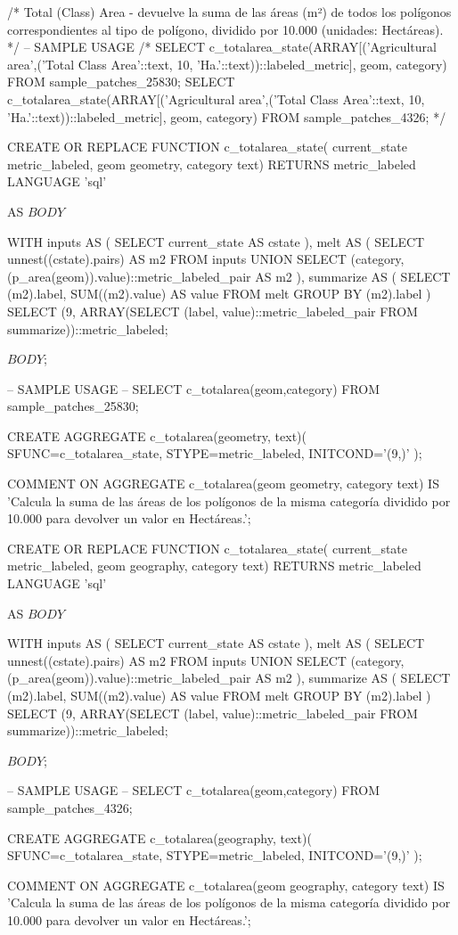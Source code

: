 \lstset{caption=Función para calcular CA por categorías.,label= c_area}
\begin{SQL}
/*
Total (Class) Area - devuelve la suma de las áreas (m²) de todos los polígonos correspondientes al tipo de polígono, dividido por 10.000 (unidades: Hectáreas).
*/
-- SAMPLE USAGE
/*
SELECT c_totalarea_state(ARRAY[('Agricultural area',('Total Class Area'::text, 10, 'Ha.'::text))::labeled_metric], geom, category) FROM sample_patches_25830;
SELECT c_totalarea_state(ARRAY[('Agricultural area',('Total Class Area'::text, 10, 'Ha.'::text))::labeled_metric], geom, category) FROM sample_patches_4326;
*/

CREATE OR REPLACE FUNCTION c_totalarea_state(
	current_state metric_labeled,
	geom geometry,
	category text)
    RETURNS metric_labeled
    LANGUAGE 'sql'

AS 
$BODY$

WITH inputs AS (
    	SELECT current_state AS cstate
), melt AS (
    	SELECT unnest((cstate).pairs) AS m2 FROM inputs
    	UNION 
	SELECT (category, (p_area(geom)).value)::metric_labeled_pair AS m2
), summarize AS (
	SELECT (m2).label, SUM((m2).value) AS value FROM melt GROUP BY (m2).label
)
SELECT (9, ARRAY(SELECT (label, value)::metric_labeled_pair FROM summarize))::metric_labeled;

$BODY$;


-- SAMPLE USAGE
-- SELECT c_totalarea(geom,category) FROM sample_patches_25830;

CREATE AGGREGATE c_totalarea(geometry, text)(
    SFUNC=c_totalarea_state,
    STYPE=metric_labeled,
    INITCOND='(9,{})'
);

COMMENT ON AGGREGATE c_totalarea(geom geometry, category text) IS 'Calcula la suma de las áreas de los polígonos de la misma categoría dividido por 10.000 para devolver un valor en Hectáreas.';



CREATE OR REPLACE FUNCTION c_totalarea_state(
	current_state metric_labeled,
	geom geography,
	category text)
    RETURNS metric_labeled
    LANGUAGE 'sql'

AS 
$BODY$

WITH inputs AS (
    	SELECT current_state AS cstate
), melt AS (
    	SELECT unnest((cstate).pairs) AS m2 FROM inputs
    	UNION 
	SELECT (category, (p_area(geom)).value)::metric_labeled_pair AS m2
), summarize AS (
	SELECT (m2).label, SUM((m2).value) AS value FROM melt GROUP BY (m2).label
)
SELECT (9, ARRAY(SELECT (label, value)::metric_labeled_pair FROM summarize))::metric_labeled;

$BODY$;


-- SAMPLE USAGE
-- SELECT c_totalarea(geom,category) FROM sample_patches_4326;

CREATE AGGREGATE c_totalarea(geography, text)(
    SFUNC=c_totalarea_state,
    STYPE=metric_labeled,
    INITCOND='(9,{})'
);

COMMENT ON AGGREGATE c_totalarea(geom geography, category text) IS 'Calcula la suma de las áreas de los polígonos de la misma categoría dividido por 10.000 para devolver un valor en Hectáreas.';
\end{SQL}
